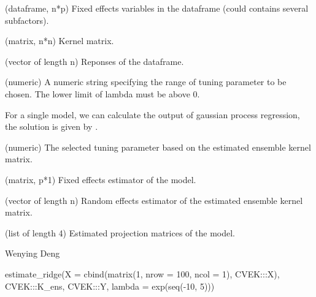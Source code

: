 \documentclass[a4paper]{book}
\begin{document}
%
\begin{Arguments}
\begin{ldescription}
\item[\code{X}] (dataframe, n*p) Fixed effects variables in the dataframe (could
contains several subfactors).

\item[\code{K}] (matrix, n*n) Kernel matrix.

\item[\code{Y}] (vector of length n) Reponses of the dataframe.

\item[\code{lambda}] (numeric) A numeric string specifying the range of tuning parameter 
to be chosen. The lower limit of lambda must be above 0.
\end{ldescription}
\end{Arguments}
%
\begin{Details}\relax
For a single model, we can calculate the output of gaussian process
regression, the solution is given by  .
\end{Details}
%
\begin{Value}
\begin{ldescription}
\item[\code{lambda}] (numeric) The selected tuning parameter based on the
estimated ensemble kernel matrix.

\item[\code{beta}] (matrix, p*1) Fixed effects estimator of the model.

\item[\code{alpha}] (vector of length n) Random effects estimator of the estimated
ensemble kernel matrix.

\item[\code{proj\_matrix}] (list of length 4) Estimated projection matrices of the
model.
\end{ldescription}
\end{Value}
%
\begin{Author}\relax
Wenying Deng
\end{Author}
%
\begin{Examples}
\begin{ExampleCode}



estimate_ridge(X = cbind(matrix(1, nrow = 100, ncol = 1), CVEK:::X), 
CVEK:::K_ens, CVEK:::Y, lambda = exp(seq(-10, 5)))



\end{ExampleCode}
\end{Examples}
\end{document}
